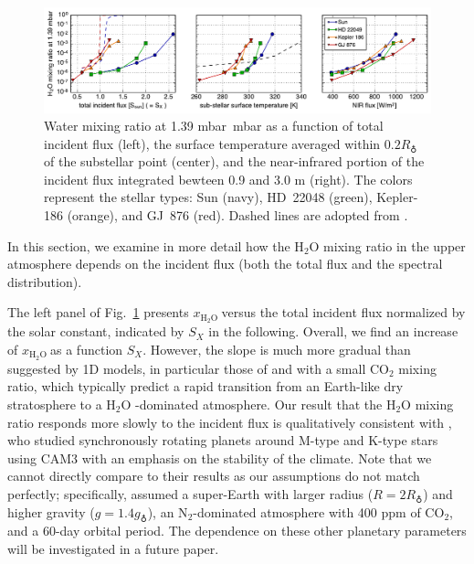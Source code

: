 \documentclass[11pt,numberedappendix,twocolappendix,]{emulateapj}
\def\water{H$_2$O }
\def\xwater{$x_\text{\water}$}
\def\preslevel{1.39 mbar\ }
\newcommand{\yf}[1]{{\color{orange}#1}}
\begin{document}
\begin{figure}[!tb]
    \begin{center}
    \includegraphics[width=\hsize]{fig/xH2O_3panels.pdf}
    \end{center}
\caption{Water mixing ratio at \preslevel mbar as a function of total incident flux (left), the surface temperature \yf{averaged within $0.2R_\earth$ of the substellar point} (center), and the near-infrared portion of the incident flux integrated bewteen 0.9 and 3.0 \textmu m (right). The colors represent the stellar types: Sun (navy), HD~22048 (green), Kepler-186 (orange), and GJ~876 (red). Dashed lines are adopted from \citet{Kasting1993}. }                                                                                                             
\label{fig:xH2O_S0X}
\end{figure}

In this section, we examine in more detail how the \water mixing ratio in the upper atmosphere depends on the incident flux (both the total flux and the spectral distribution). 

The left panel of Fig.~\ref{fig:xH2O_S0X} presents \xwater versus the total incident flux normalized by the solar constant, indicated by $S_X$ in the following. 
Overall, we find an increase of \xwater as a function $S_X$. 
However, the slope is much more gradual than suggested by 1D models, in particular those  of \citet{Kasting1993} and \citet{Wordsworth2013} with a small CO$_2$ mixing ratio, which typically predict a rapid transition from an Earth-like dry stratosphere to a \water-dominated atmosphere. 
Our result that the \water mixing ratio responds more slowly to the incident flux is qualitatively consistent with \citet{Yang2013}, who studied synchronously rotating planets around M-type and K-type stars using CAM3 with an emphasis on the stability of the climate. 
Note that we cannot directly compare to their results as our assumptions do not match perfectly; specifically, \cite{Yang2013} assumed a super-Earth with larger radius ($R=2R_\earth$) and higher gravity ($g=1.4g_\earth$), an N$_2$-dominated atmosphere with 400 ppm of CO$_2$, and a 60-day orbital period. 
The dependence on these other planetary parameters will be investigated in a future paper. 
\end{document}
